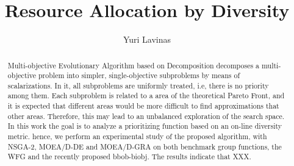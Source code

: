 \documentclass{IEEEtran}
\begin{document}
\title{Resource Allocation by Diversity}
\author{Yuri Lavinas}

\maketitle



\begin{abstract}
	
	Multi-objective Evolutionary Algorithm based on Decomposition decomposes a multi-objective problem into simpler, single-objective subproblems by means of scalarizations. In it, all subproblems are uniformly treated, i.e, there is no priority among them. Each subproblem is related to a area of the theoretical Pareto Front, and it is expected that different areas would be more difficult to find approximations that other areas. Therefore, this may lead to an unbalanced exploration of the search space. In this work the goal is to analyze a prioritizing function based on an on-line diversity metric. hence, we perform an experimental study of the proposed algorithm, with NSGA-2, MOEA/D-DE and MOEA/D-GRA on both benchmark group functions, the WFG and the recently proposed bbob-biobj. The results indicate that XXX.
\end{abstract}




\end{document}
